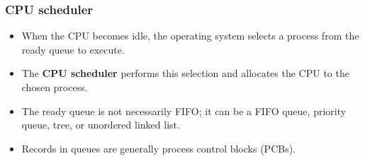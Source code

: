 \subsubsection{CPU scheduler}
\begin{itemize}
    \item When the CPU becomes idle, the operating system selects a process from the ready queue to execute.
    \item The \textbf{CPU scheduler} performs this selection and allocates the CPU to the chosen process.
    \item The ready queue is not necessarily FIFO; it can be a FIFO queue, priority queue, tree, or unordered linked list.
    \item Records in queues are generally process control blocks (PCBs).
\end{itemize}

